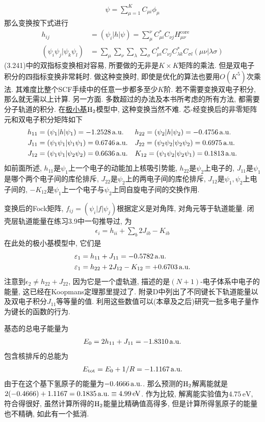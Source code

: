 \begin{align}
\psi = \sum_{\mu=1}^{K}C_{\mu i}\phi_\mu
\end{align}
那么变换按下式进行
\begin{align}
h_{ij} & = (\psi_i|h|\psi) = \sum_{\mu}^{\nu}C_{\mu i}^*C_{\nu j}H_{\mu\nu}^\mathrm{core}\\
(\psi_i\psi_j|\psi_k\psi_l) & = \sum_\mu\sum_\nu\sum_\lambda\sum_\sigma C_{\mu i}^*C_{\nu j}C_{\lambda k}^*C_{\sigma l}(\mu\nu|\lambda\sigma)
\end{align}
(3.241)中的双指标变换相对容易, 所要做的无非是$K\times K$矩阵的乘法. 但是双电子积分的四指标变换非常耗时. 做这种变换时, 即使是优化的算法也要用$O(K^5)$次乘法. 其难度比整个SCF手续中的任意一步都多至少$K$阶. 若不需要变换双电子积分, 那么就无需以上计算. 另一方面. 多数超过\hft 的办法及本书所考虑的所有方法, 都需要分子轨道的积分. 在\underline{极小基$\mathrm{H}_2$}模型中, 这种变换当然不难. 芯-\ha 经变换后的非零矩阵元和双电子积分矩阵如下
\begin{align*}
h_{11}& =(\psi_1|h|\psi_1)=-1.2528\,\mathrm{a.u.} &&h_{22}=(\psi_2|h|\psi_2)=-0.4756\,\mathrm{a.u.}\\
J_{11}& =(\psi_1\psi_1|\psi_1\psi_1)=0.6746\,\mathrm{a.u.} &&J_{22}=(\psi_2\psi_2|\psi_2\psi_2)=0.6975\,\mathrm{a.u.}\\
J_{12}& =(\psi_1\psi_1|\psi_2\psi_2)=0.6636\,\mathrm{a.u.} &&K_{12}=(\psi_1\psi_2|\psi_2\psi_1)=0.1813\,\mathrm{a.u.}
\end{align*}
如前面所述, $h_{11}$是$\psi_1$上一个电子的动能加上核吸引势能, $h_{22}$是$\psi_2$上电子的, $J_{11}$是$\psi_1$是哪个两个电子间的库伦排斥, $J_{22}$是$\psi_2$上的两电子间的库伦排斥, $J_{12}$是$\psi_1,\psi_2$上电子间的, $-K_{12}$是$\psi_1$上一个电子与$\psi_2$上同自旋电子间的交换作用.

变换后的Fock矩阵, $f_{ij}=(\psi_i|f|\psi_j)$根据定义是对角阵, 对角元等于轨道能量. 闭壳层轨道能量在练习3.9中一句推导过, 为
\begin{align}
\epsilon_i = h_{ii} + \sum_b2J_{ib} -K_{ib}
\end{align}
在此处的极小基模型中, 它们是
\begin{align}
\varepsilon_1 & = h_{11} + J_{11} = -0.5782\,\mathrm{a.u.}\\
\varepsilon_1 & = h_{22} + 2J_{12} - K_{12} = +0.6703\,\mathrm{a.u.}
\end{align}
注意到$\epsilon_2\neq h_{22}+J_{22}$, 因为它是一个虚轨道, 描述的是$(N+1)$-电子体系中电子的能量, 这已经在Koopmans定理那里提过了. 附录D中列出了不同键长下轨道能量以及双电子积分$J_{11}$等等量的值. 利用这些数值可以(本章及之后)研究一批多电子量作为键长的函数的行为.

基态的总电子能量为
\begin{align}
E_0 = 2h_{11} + J_{11} = -1.8310\,\mathrm{a.u.}
\end{align}
包含核排斥的总能为
\begin{align}
E_\mathrm{tot} = E_0 + 1/R = -1.1167\,\mathrm{a.u.}
\end{align}
由于在这个基下氢原子的能量为$-0.4666\,\mathrm{a.u.}$. 那么预测的$\mathrm{H}_2$解离能就是$2(-0.4666)+1.1167=0.1835\,\mathrm{a.u.}\equiv 4.99\,\mathrm{eV}$. 作为比较, 解离能实验值为$4.75\,\mathrm{eV}$, 符合得很好, 虽然计算所得的$\mathrm{H}_2$能量比精确值高得多, 但是计算所得氢原子的能量也不精确, 如此有一个抵消.


